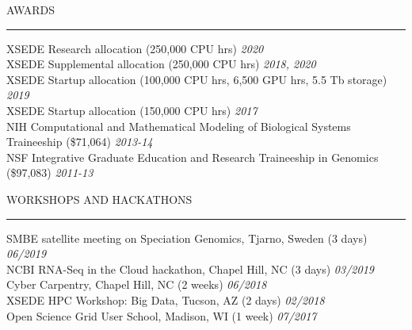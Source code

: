 \documentclass{resume} %
\renewenvironment{rSection}[1]{
\sectionskip
\textcolor{RoyalPurple}{\MakeUppercase{#1}}
\sectionlineskip
\hrule
\begin{list}{}{
\setlength{\leftmargin}{1.5em}
}
\item[]
}{
\end{list}
}
\begin{document}

\begin{rSection}{Awards}
XSEDE Research allocation (250,000 CPU hrs) \hfill{\em 2020}\\
XSEDE Supplemental allocation (250,000 CPU hrs) \hfill{\em 2018, 2020}\\
XSEDE Startup allocation (100,000 CPU hrs, 6,500 GPU hrs, 5.5 Tb storage) \hfill{\em 2019}\\
XSEDE Startup allocation (150,000 CPU hrs) \hfill{\em 2017}\\
NIH Computational and Mathematical Modeling of Biological Systems Traineeship (\$71,064) \hfill {\em 2013-14}\\
NSF Integrative Graduate Education and Research Traineeship in Genomics (\$97,083) \hfill {\em 2011-13}\\

\end{rSection}




\begin{rSection}{Workshops and Hackathons}

SMBE satellite meeting on Speciation Genomics, Tjarno, Sweden (3 days) \hfill{\em 06/2019}\\
NCBI RNA-Seq in the Cloud hackathon, Chapel Hill, NC (3 days) \hfill {\em 03/2019}\\
Cyber Carpentry, Chapel Hill, NC (2 weeks) \hfill {\em 06/2018}\\
XSEDE HPC Workshop: Big Data, Tucson, AZ (2 days) \hfill {\em 02/2018}\\
Open Science Grid User School, Madison, WI (1 week) \hfill {\em 07/2017}

\end{rSection}
\end{document}
